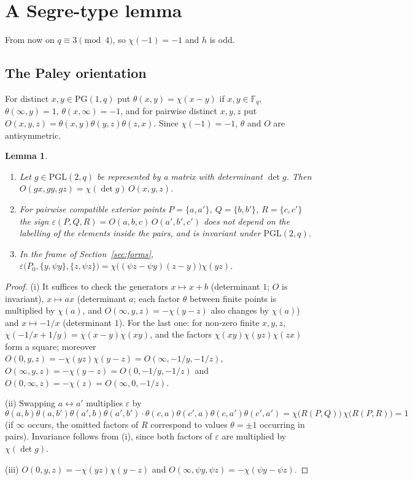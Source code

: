 \documentclass[11pt]{amsart}
\newtheorem{lemma}[theorem]{Lemma}
\theoremstyle{definition}
\theoremstyle{remark}
\numberwithin{equation}{section}
\newcommand{\F}{\mathbb{F}_q}
\newcommand{\PGone}{\mathrm{PG}(1,q)}
\newcommand{\PGL}{\mathrm{PGL}(2,q)}
\begin{document}
\section{A Segre-type lemma}\label{sec:segre}

From now on $q\equiv3\pmod4$, so $\chi(-1)=-1$ and $h$ is odd.

\subsection{The Paley orientation}
For distinct $x,y\in\PGone$ put $\theta(x,y)=\chi(x-y)$ if $x,y\in\F$, $\theta(\infty,y)=1$, $\theta(x,\infty)=-1$, and for pairwise
distinct $x,y,z$ put $O(x,y,z)=\theta(x,y)\theta(y,z)\theta(z,x)$. Since $\chi(-1)=-1$, $\theta$ and $O$ are antisymmetric.

\begin{lemma}\label{lem:eps}
\begin{enumerate}
\item[(i)] Let $g\in\PGL$ be represented by a matrix with determinant $\det g$. Then
$O(gx,gy,gz)=\chi(\det g)\,O(x,y,z)$.
\item[(ii)] For pairwise compatible exterior points $P=\{a,a'\}$, $Q=\{b,b'\}$, $R=\{c,c'\}$ the sign
$\varepsilon(P,Q,R)=O(a,b,c)\,O(a',b',c')$ does not depend on the labelling of the elements inside the pairs, and is invariant
under $\PGL$.
\item[(iii)] In the frame of Section~\ref{sec:forms}, $\varepsilon\bigl(P_0,\{y,\psi y\},\{z,\psi z\}\bigr)=\chi\bigl((\psi z-\psi
y)(z-y)\bigr)\chi(yz)$.
\end{enumerate}
\end{lemma}

\begin{proof}
(i) It suffices to check the generators $x\mapsto x+b$ (determinant $1$; $O$ is invariant), $x\mapsto ax$ (determinant $a$;
each factor $\theta$ between finite points is multiplied by $\chi(a)$, and $O(\infty,y,z)=-\chi(y-z)$ also changes by $\chi(a)$)
and $x\mapsto-1/x$ (determinant $1$). For the last one: for non-zero finite $x,y,z$,
$\chi(-1/x+1/y)=\chi(x-y)\chi(xy)$, and the factors $\chi(xy)\chi(yz)\chi(zx)$ form a square; moreover
$O(0,y,z)=-\chi(yz)\chi(y-z)=O(\infty,-1/y,-1/z)$, $O(\infty,y,z)=-\chi(y-z)=O(0,-1/y,-1/z)$ and
$O(0,\infty,z)=-\chi(z)=O(\infty,0,-1/z)$.

(ii) Swapping $a\leftrightarrow a'$ multiplies $\varepsilon$ by
\[
\theta(a,b)\theta(a,b')\theta(a',b)\theta(a',b')\cdot\theta(c,a)\theta(c',a)\theta(c,a')\theta(c',a')=\chi\bigl(R(P,Q)\bigr)\,\chi\bigl(R(P,R)\bigr)=1
\]
(if $\infty$ occurs, the omitted factors of $R$ correspond to values $\theta=\pm1$ occurring in pairs). Invariance follows from (i),
since both factors of $\varepsilon$ are multiplied by $\chi(\det g)$.

(iii) $O(0,y,z)=-\chi(yz)\chi(y-z)$ and $O(\infty,\psi y,\psi z)=-\chi(\psi y-\psi z)$.
\end{proof}
\end{document}
